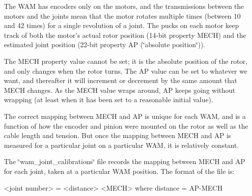 \begin{DoxyItemize}
\item The W\-A\-M has encoders only on the motors, and the transmissions between the motors and the joints mean that the motor rotates multiple times (between 10 and 42 times) for a single revolution of a joint. The pucks on each motor keep track of both the motor's actual rotor position (14-\/bit property M\-E\-C\-H) and the estimated joint position (22-\/bit property A\-P (\char`\"{}absolute position\char`\"{})).
\item The M\-E\-C\-H property value cannot be set; it is the absolute position of the rotor, and only changes when the rotor turns. The A\-P value can be set to whatever we want, and thereafter it will increment or decrement by the same amount that M\-E\-C\-H changes. As the M\-E\-C\-H value wraps around, A\-P keeps going without wrapping (at least when it has been set to a reasonable initial value).
\item The correct mapping between M\-E\-C\-H and A\-P is unique for each W\-A\-M, and is a function of how the encoder and pinion were mounted on the rotor as well as the cable length and tension. But once the mapping between M\-E\-C\-H and A\-P is measured for a particular joint on a particular W\-A\-M, it is relatively constant.
\item The \char`\"{}wam\-\_\-joint\-\_\-calibrations\char`\"{} file records the mapping between M\-E\-C\-H and A\-P for each joint, taken at a particular W\-A\-M position. The format of the file is\-: \begin{DoxyVerb}<joint number> = <distance> <MECH>
where distance = AP-MECH
\end{DoxyVerb}


\end{DoxyItemize}
